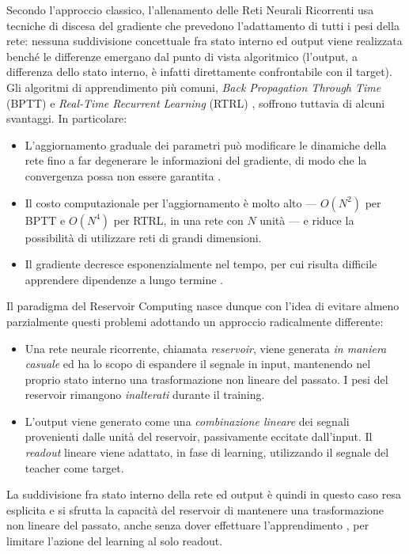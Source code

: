 Secondo l'approccio classico, l'allenamento delle Reti Neurali Ricorrenti usa tecniche di discesa del gradiente che prevedono l'adattamento di tutti i pesi della rete: nessuna suddivisione concettuale fra stato interno ed output viene realizzata benché le differenze emergano dal punto di vista algoritmico (l'output, a differenza dello stato interno, è infatti direttamente confrontabile con il target). Gli algoritmi di apprendimento più comuni, \emph{Back Propagation Through Time} (BPTT) \cite{Werbos:BPTT} e \emph{Real-Time Recurrent Learning} (RTRL) \cite{Williams:RTRL}, soffrono tuttavia di alcuni svantaggi. In particolare:
\begin{itemize}
\item L'aggiornamento graduale dei parametri può modificare le dinamiche della rete fino a far degenerare le informazioni del gradiente, di modo che la convergenza possa non essere garantita \cite{Doya:Bifurcations}.
\item Il costo computazionale per l'aggiornamento è molto alto ---  $O(N^2)$ per BPTT e $O(N^4)$ per RTRL, in una rete con $N$ unità --- e riduce la possibilità di utilizzare reti di grandi dimensioni.
\item Il gradiente decresce esponenzialmente nel tempo, per cui risulta difficile apprendere dipendenze a lungo termine \cite{Bengio:TheProblemOfLearning}.
\end{itemize}

Il paradigma del Reservoir Computing nasce dunque con l'idea di evitare almeno parzialmente questi problemi adottando un approccio radicalmente differente:
\begin{itemize}
\item Una rete neurale ricorrente, chiamata \emph{reservoir}, viene generata \emph{in maniera casuale} ed ha lo scopo di espandere il segnale in input, mantenendo nel proprio stato interno una trasformazione non lineare del passato. I pesi del reservoir rimangono \emph{inalterati} durante il training. 
\item L'output viene generato come una \emph{combinazione lineare} dei segnali provenienti dalle unità del reservoir, passivamente eccitate dall'input. Il \emph{readout} lineare viene adattato, in fase di learning, utilizzando il segnale del teacher come target.
\end{itemize}
La suddivisione fra stato interno della rete ed output è quindi in questo caso resa esplicita e si sfrutta la capacità del reservoir di mantenere una trasformazione non lineare del passato, anche senza dover effettuare l'apprendimento \cite{Tino:MarkovianArchitecturalBias}, per limitare l'azione del learning al solo readout.

